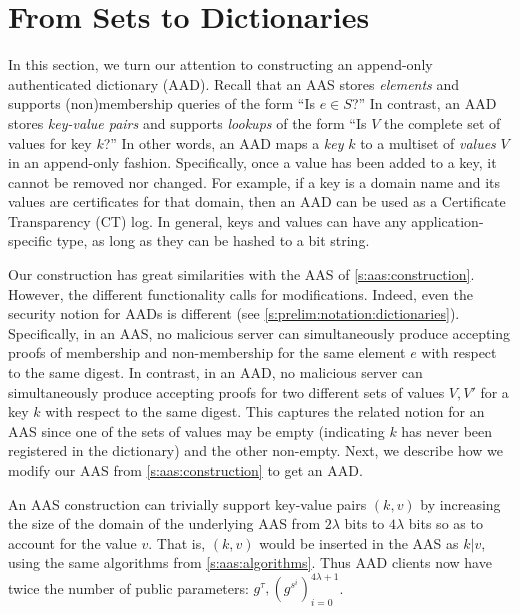 \section{From Sets to Dictionaries}
\label{s:aad}
In this section, we turn our attention to constructing an append-only authenticated dictionary (AAD).
Recall that an AAS stores \textit{elements} and supports (non)membership queries of the form ``Is $e\in S$?''
In contrast, an AAD stores \textit{key-value pairs} and supports \textit{lookups} of the form ``Is $V$ the complete set of values for key $k$?''
In other words, an AAD maps a \textit{key} $k$ to a multiset of \textit{values} $V$ in an append-only fashion.
Specifically, once a value has been added to a key, it cannot be removed nor changed.
For example, if a key is a domain name and its values are certificates for that domain, then an AAD can be used as a Certificate Transparency (CT) log.
In general, keys and values can have any application-specific type, as long as they can be hashed to a bit string.

Our construction  has great similarities with the AAS of \cref{s:aas:construction}.
However, the different functionality calls for modifications. 
Indeed, even the security notion for AADs is different (see \cref{s:prelim:notation:dictionaries}).
Specifically, in an AAS, no malicious server can simultaneously produce accepting proofs of membership and non-membership for the same element $e$ with respect to the same digest.
In contrast, in an AAD, no malicious server can simultaneously produce accepting proofs for two different sets of values $V,V'$ for a key $k$ with respect to the same digest.
This captures the related notion for an AAS since one of the sets of values may be empty (indicating $k$ has never been registered in the dictionary) and the other non-empty.
Next, we describe how we modify our AAS from \cref{s:aas:construction} to get an AAD.

An AAS construction can trivially support key-value pairs $(k,v)$ by increasing the size of the domain of the underlying AAS from $2\lambda$ bits to $4\lambda$ bits so as to account for the value $v$. 
That is, $(k,v)$ would be inserted in the AAS as $k|v$, using the same algorithms from \cref{s:aas:algorithms}.
Thus AAD clients now have twice the number of public parameters: $g^\tau, (g^{s^i})_{i=0}^{4\lambda+1}$.

